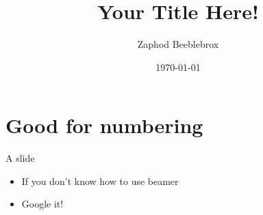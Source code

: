\documentclass[xcolor=dvipsnames]{beamer}
\title[YTH!]{Your Title Here!}
\author{Zaphod Beeblebrox}
\institute[ZBI]{}
\date{\today}
\begin{document}
{\nologo
\begin{frame}
\titlepage
\end{frame}
}


\section*{Good for numbering}

\begin{frame}{A slide}

\begin{itemize}
	\item If you don't know how to use beamer
	\item Google it!
\end{itemize}

\end{frame}
\end{document}
